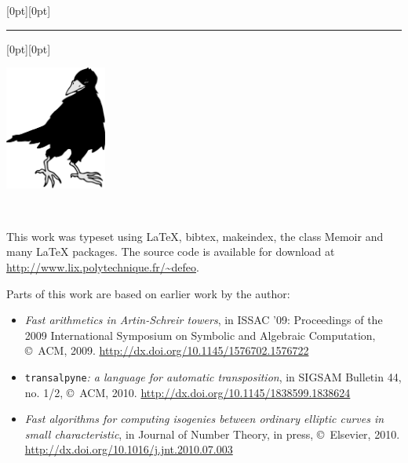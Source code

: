 \begin{titlingpage}
  \maketitle
\end{titlingpage}

\begin{titlingpage}
  \setlength{\parindent}{0pt}
  
  \raisebox{-11\onelineskip}[0pt][0pt]{\rule{1.1\textwidth}{0.5pt}}
  \raisebox{0pt}[0pt][0pt]{\makebox[\textwidth][r]{\rule[-\textheight]{0.5pt}{\textheight}}}
  \parbox{0.6\textwidth}{
    \begin{flushright}
      \vspace{2\onelineskip}
      \huge
      \scshape{\thetitle}
    \end{flushright}}
  \hfill
  \parbox{0.25\textwidth}{
      \ifartwork
    \includegraphics[width=0.25\textwidth]{artwork/corbeau}
    \fi
  }
  \hfill~
  \clearpage
  ~\vfill
  \footnotesize

  This work was typeset using \LaTeX{}, bibtex, makeindex, the class
  Memoir and many \LaTeX{} packages. The source code is available for
  download at \url{http://www.lix.polytechnique.fr/~defeo}.

  \bigskip

  Parts of this work are based on earlier work by the author:
  \begin{itemize}
  \item \textit{Fast arithmetics in Artin-Schreir towers}, in ISSAC
    '09: Proceedings of the 2009 International Symposium on Symbolic
    and Algebraic Computation, \copyright{}~ACM,
    2009. \url{http://dx.doi.org/10.1145/1576702.1576722}
  \item \texttt{transalpyne}\textit{: a language for automatic
      transposition}, in SIGSAM Bulletin 44, no. 1/2,
    \copyright{}~ACM,
    2010. \url{http://dx.doi.org/10.1145/1838599.1838624}
  \item \textit{Fast algorithms for computing isogenies between
      ordinary elliptic curves in small characteristic}, in Journal of
    Number Theory, in press, \copyright{}~Elsevier,
    2010. \url{http://dx.doi.org/10.1016/j.jnt.2010.07.003}
  \end{itemize}


\end{titlingpage}
